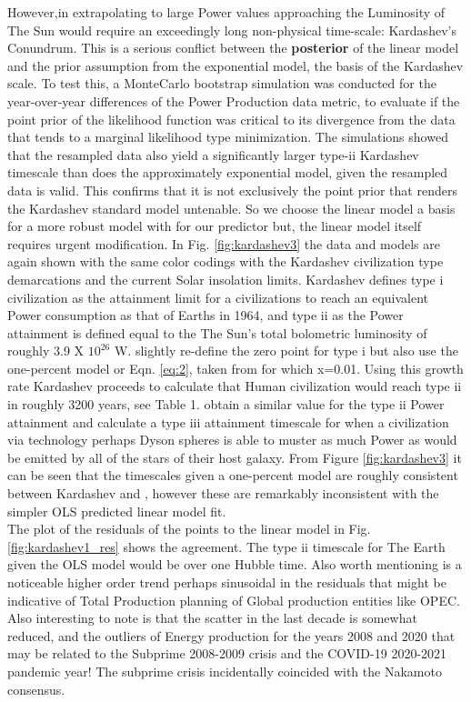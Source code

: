 \documentclass[final,5p,times,twocolumn,authoryear]{elsarticle}
\begin{document}
However,in extrapolating to large Power values approaching the Luminosity of The Sun would require an exceedingly long non-physical time-scale: Kardashev's Conundrum. This is a serious conflict between the \textbf{posterior} of the linear model and the prior assumption from the exponential model, the basis of the Kardashev scale. To test this, a MonteCarlo bootstrap simulation was conducted for the year-over-year differences of the Power Production data metric, to evaluate if the point prior of the likelihood function was critical to its divergence from the data that tends to a marginal likelihood type minimization. The simulations showed that the resampled data also yield a significantly larger type-ii Kardashev timescale than does the approximately exponential model, given the resampled data is valid. This confirms that it is not exclusively the point prior that renders the Kardashev standard model untenable. So we choose the linear model a basis for a  more robust model with for our predictor but, the linear model itself requires urgent modification.
In Fig. \ref{fig:kardashev3} the data and models are again shown with the same color codings with the Kardashev civilization type demarcations and the current Solar insolation limits. Kardashev defines type i civilization as the attainment limit for a civilizations to reach an equivalent Power consumption as that of Earths in 1964, and type ii as the Power attainment is defined equal to the The Sun's total bolometric luminosity of roughly 3.9 X $10^{26}$ W. \cite{sagan73} slightly re-define the zero point for type i but \cite{sagan73} also use the one-percent model or Eqn. \ref{eq:2}, taken from \cite{kar64} for which x=0.01. Using  this growth rate Kardashev proceeds to calculate that Human civilization would reach type ii in roughly 3200 years, see Table 1. \cite{sagan73} obtain a similar value for the type ii Power attainment and calculate a type iii attainment timescale for when a civilization via technology perhaps Dyson spheres is able to muster as much Power as would be emitted by all of the stars of their host galaxy. From Figure \ref{fig:kardashev3} it can be seen that the timescales given a one-percent model are roughly consistent between Kardashev and \cite{sagan73}, however these are remarkably inconsistent with the simpler OLS predicted linear model fit. \\  
The plot of the residuals of the points to the linear model in Fig. \ref{fig:kardashev1_res} shows the agreement. 
The type ii timescale for The Earth given the OLS model would be over one Hubble time. Also worth mentioning is a noticeable higher order trend perhaps sinusoidal in the residuals that might be indicative of Total Production planning of Global production entities like OPEC. Also interesting to note is that the scatter in the last decade is somewhat reduced, and the outliers of Energy production for the years 2008 and 2020 that may be related to the Subprime 2008-2009 crisis and the COVID-19 2020-2021 pandemic year! The subprime crisis incidentally coincided with the Nakamoto consensus. 
\end{document}
